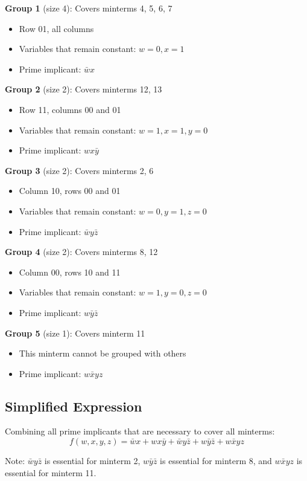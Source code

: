 \documentclass[11pt]{article}
\begin{document}
\textbf{Group 1} (size 4): Covers minterms 4, 5, 6, 7
\begin{itemize}
\item Row 01, all columns
\item Variables that remain constant: \(w=0, x=1\)
\item Prime implicant: \(\bar{w}x\)
\end{itemize}

\textbf{Group 2} (size 2): Covers minterms 12, 13
\begin{itemize}
\item Row 11, columns 00 and 01
\item Variables that remain constant: \(w=1, x=1, y=0\)
\item Prime implicant: \(wx\bar{y}\)
\end{itemize}

\textbf{Group 3} (size 2): Covers minterms 2, 6
\begin{itemize}
\item Column 10, rows 00 and 01
\item Variables that remain constant: \(w=0, y=1, z=0\)
\item Prime implicant: \(\bar{w}y\bar{z}\)
\end{itemize}

\textbf{Group 4} (size 2): Covers minterms 8, 12
\begin{itemize}
\item Column 00, rows 10 and 11
\item Variables that remain constant: \(w=1, y=0, z=0\)
\item Prime implicant: \(w\bar{y}\bar{z}\)
\end{itemize}

\textbf{Group 5} (size 1): Covers minterm 11
\begin{itemize}
\item This minterm cannot be grouped with others
\item Prime implicant: \(w\bar{x}yz\)
\end{itemize}
\subsection{Simplified Expression}
\label{sec:orgadfec80}
Combining all prime implicants that are necessary to cover all minterms:
\[
\boxed{f(w,x,y,z) = \bar{w}x + wx\bar{y} + \bar{w}y\bar{z} + w\bar{y}\bar{z} + w\bar{x}yz}
\]

Note: \(\bar{w}y\bar{z}\) is essential for minterm 2, \(w\bar{y}\bar{z}\) is essential for minterm 8, and \(w\bar{x}yz\) is essential for minterm 11.
\end{document}
